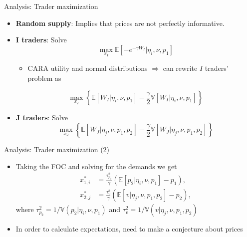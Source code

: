 \documentclass[english,10pt
,aspectratio=169
]{beamer}
\begin{document}
\begin{frame}{Analysis: Trader maximization}
	\begin{itemize}
		\item \textbf{Random supply}: Implies that prices are not perfectly informative.
		\item \textbf{I traders}: Solve
		\[
			\max_{x_I} \mathbb{E}\left[ -e^{-\gamma W_I}| \eta_i, \nu, p_1 \right]
		\]
		\begin{itemize}
			\item CARA utility and normal distributions $\Rightarrow$ can rewrite $I$ traders' problem as
		\end{itemize}
		\[
			\max_{x_I} \left\{\mathbb{E}\left[W_I| \eta_i, \nu, p_1\right]-\frac{\gamma}{2} \mathbb{V}\left[W_I| \eta_i, \nu, p_1\right]\right\}
		\]
		\item \textbf{J traders}: Solve
		\[
			\max_{x_J} \left\{\mathbb{E}\left[W_J| \eta_j, \nu, p_1, p_2\right]-\frac{\gamma}{2} \mathbb{V}\left[W_J| \eta_j, \nu, p_1, p_2\right] \right\}
		\]
	\end{itemize}
\end{frame}


\begin{frame}{Analysis: Trader maximization (2)}
	\begin{itemize}
		\item Taking the FOC and solving for the demands we get 
		\begin{align}
			x^*_{1,i} &= \frac{\tau^2_{p_2}}{\gamma}(\mathbb{E}[p_2| \eta_i, \nu, p_1]-p_1), \label{eqfoc1} \\
			x^*_{2,j} &= \frac{\tau^2_v}{\gamma} (\mathbb{E}[v| \eta_j, \nu, p_1, p_2]-p_2), \label{eqfoc2}
		\end{align}
		where $\tau^2_{p_2}=1/\mathbb{V}(p_2| \eta_i, \nu, p_1)$ and $\tau^2_{v}=1/\mathbb{V}(v| \eta_j, \nu, p_1, p_2)$
		\item In order to calculate expectations, need to make a conjecture about prices
	\end{itemize}
\end{frame}
\end{document}
